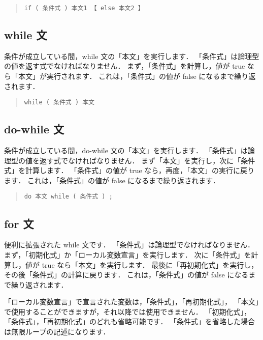 \begin{quote}
\begin{verbatim}
if ( 条件式 ) 本文1 【 else 本文2 】 
\end{verbatim}
\end{quote}

\subsection{while 文}

条件が成立している間，while 文の「本文」を実行します．
「条件式」は論理型の値を返す式でなければなりません．
まず，「条件式」を計算し，値が true なら「本文」が実行されます．
これは，「条件式」の値が false になるまで繰り返されます．

\begin{quote}
\begin{verbatim}
while ( 条件式 ) 本文
\end{verbatim}
\end{quote}

\subsection{do-while 文}

条件が成立している間，do-while 文の「本文」を実行します．
「条件式」は論理型の値を返す式でなければなりません．
まず「本文」を実行し，次に「条件式」を計算します．
「条件式」の値が true なら，再度，「本文」の実行に戻ります．
これは，「条件式」の値が false になるまで繰り返されます．

\begin{quote}
\begin{verbatim}
do 本文 while ( 条件式 ) ;
\end{verbatim}
\end{quote}

\subsection{for 文}

便利に拡張された while 文です．
「条件式」は論理型でなければなりません．
まず，「初期化式」か「ローカル変数宣言」を実行します．
次に「条件式」を計算し，値が true なら「本文」を実行します．
最後に「再初期化式」を実行し，その後「条件式」の計算に戻ります．
これは，「条件式」の値が false になるまで繰り返されます．

「ローカル変数宣言」で宣言された変数は，「条件式」，「再初期化式」，
「本文」で使用することができますが，それ以降では使用できません．
「初期化式」，「条件式」，「再初期化式」のどれも省略可能です．
「条件式」を省略した場合は無限ループの記述になります．


